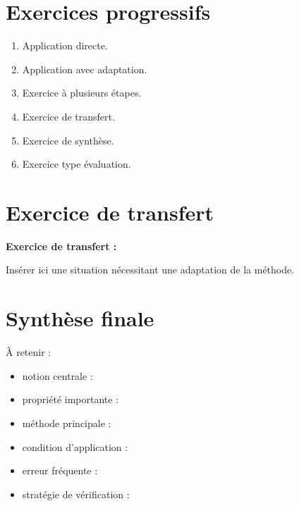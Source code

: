 \documentclass[11pt,a4paper]{article}
\begin{document}
\section{Exercices progressifs}

\begin{cadreactivite}
\begin{enumerate}
    \item Application directe.
    \item Application avec adaptation.
    \item Exercice à plusieurs étapes.
    \item Exercice de transfert.
    \item Exercice de synthèse.
    \item Exercice type évaluation.
\end{enumerate}
\end{cadreactivite}

\section{Exercice de transfert}

\begin{cadreenonce}
\textbf{Exercice de transfert :}

Insérer ici une situation nécessitant une adaptation de la méthode.
\end{cadreenonce}

\section{Synthèse finale}

\begin{cadresynthese}
À retenir :

\begin{itemize}
    \item notion centrale : \dotfill
    \item propriété importante : \dotfill
    \item méthode principale : \dotfill
    \item condition d’application : \dotfill
    \item erreur fréquente : \dotfill
    \item stratégie de vérification : \dotfill
\end{itemize}
\end{cadresynthese}
\end{document}
